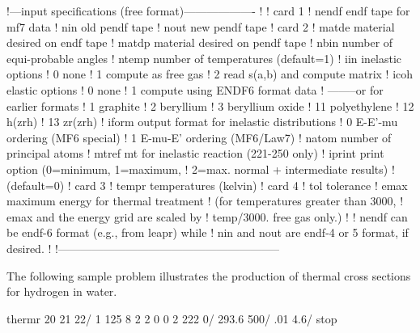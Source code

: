 \vspace{3 pt}
\small
\begin{ccode}

   !---input specifications (free format)-------------------
   !
   !  card 1
   !     nendf      endf tape for mf7 data
   !     nin        old pendf tape
   !     nout       new pendf tape
   !  card 2
   !     matde      material desired on endf tape
   !     matdp      material desired on pendf tape
   !     nbin       number of equi-probable angles
   !     ntemp      number of temperatures (default=1)
   !     iin        inelastic options
   !                   0     none
   !                   1     compute as free gas
   !                   2     read s(a,b) and compute matrix
   !     icoh       elastic options
   !                   0     none
   !                   1     compute using ENDF6 format data
   !                   --------or for earlier formats
   !                   1     graphite
   !                   2     beryllium
   !                   3     beryllium oxide
   !                  11     polyethylene
   !                  12     h(zrh)
   !                  13     zr(zrh)
   !     iform      output format for inelastic distributions
   !                  0      E-E'-mu ordering (MF6 special)
   !                  1      E-mu-E' ordering (MF6/Law7)
   !     natom      number of principal atoms
   !     mtref      mt for inelastic reaction (221-250 only)
   !     iprint     print option (0=minimum, 1=maximum,
   !                2=max. normal + intermediate results)
   !                (default=0)
   !  card 3
   !     tempr      temperatures (kelvin)
   !  card 4
   !     tol        tolerance
   !     emax       maximum energy for thermal treatment
   !                (for temperatures greater than 3000,
   !                emax and the energy grid are scaled by
   !                temp/3000.  free gas only.)
   !
   !       nendf can be endf-6 format (e.g., from leapr) while
   !       nin and nout are endf-4 or 5 format, if desired.
   !
   !-----------------------------------------------------------

\end{ccode}
\normalsize

The following sample problem illustrates the production of thermal
cross sections for hydrogen in water.

\vspace{1 pt}
\small
\begin{ccode}

 thermr
 20 21 22/
 1 125 8 2 2 0 0 2 222 0/
 293.6 500/
 .01 4.6/
 stop

\end{ccode}
\normalsize

